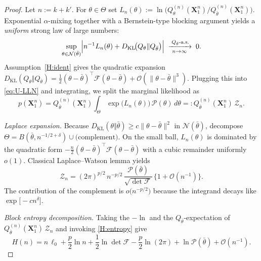 \documentclass{article}
\begin{document}
\begin{proof}
Let $n:=k+k'$.  For $\theta\in\Theta$ set
$L_n(\theta):=
    \ln\!\bigl(Q^{(n)}_\theta(\mathbf X_{1}^{n})/
                Q^{(n)}_{\bar\theta}(\mathbf X_{1}^{n})\bigr)$.
Exponential $\alpha$-mixing together with a Bernstein-type blocking argument
\citep{dedecker2007weak,dedecker2003conditional} yields a \emph{uniform}
strong law of large numbers:
\begin{equation}
  \sup_{\theta\in\mathcal N(\bar\theta)}
  \Bigl|
      n^{-1}L_n(\theta)
      + D_{\mathrm{KL}}\!\bigl(Q_\theta\Vert Q_{\bar\theta}\bigr)
  \Bigr|
  \;\xrightarrow[n\to\infty]{\;Q_{\bar\theta}\textrm{-a.s.}}\;
  0.
  \label{eq:U-LLN}
\end{equation}
Assumption~\ref{H:ident} gives the quadratic expansion
$D_{\mathrm{KL}}(Q_\theta\Vert Q_{\bar\theta})
  =\tfrac12(\theta-\bar\theta)^{\!\top}\!\mathcal F(\theta-\bar\theta)
   +\mathcal O(\|\theta-\bar\theta\|^{3})$.
Plugging this into \eqref{eq:U-LLN} and integrating, we split the marginal
likelihood as
\[
  p(\mathbf X_{1}^{n})
  = Q^{(n)}_{\bar\theta}(\mathbf X_{1}^{n})
    \int_{\Theta} \exp\!\bigl(L_{n}(\theta)\bigr)\,
                 \mathcal P(\theta)\,d\theta
  =: Q^{(n)}_{\bar\theta}(\mathbf X_{1}^{n})\,\mathcal Z_n.
\]

\emph{Laplace expansion.}  Because
$D_{\mathrm{KL}}(\theta\Vert\bar\theta)\ge
  c\|\theta-\bar\theta\|^{2}$ in $\mathcal N(\bar\theta)$, decompose
$\Theta=B(\bar\theta,n^{-1/2+\delta})\cup\text{(complement)}$.  On the small
ball, $L_n(\theta)$ is dominated by the quadratic form
$-\frac n2(\theta-\bar\theta)^{\!\top}\!\mathcal F(\theta-\bar\theta)$ with a
cubic remainder uniformly $o(1)$.  Classical Laplace–Watson lemma
\citep[Chap.\,6]{bleistein2012asymptotic} yields
\begin{equation}
  \mathcal Z_n
  =(2\pi)^{p/2}\,n^{-p/2}\,
    \frac{\mathcal P(\bar\theta)}{\sqrt{\det\mathcal F}}\,
    \bigl\{1+\mathcal O(n^{-1})\bigr\}.
  \label{eq:Laplace}
\end{equation}
The contribution of the complement is $o\!\bigl(n^{-p/2}\bigr)$ because the
integrand decays like $\exp\!\bigl[-c n^{\delta}\bigr]$.

\emph{Block entropy decomposition.}
Taking the $-\ln$ and the $Q_{\bar\theta}$-expectation of
$Q^{(n)}_{\bar\theta}(\mathbf X_{1}^{n})\,\mathcal Z_n$
and invoking \ref{H:entropy} give
\begin{equation}
  H(n)
  = n\,\ell_{0}
    +\frac{p}{2}\ln n
    +\frac12\ln\det\mathcal F
    -\frac{p}{2}\ln(2\pi)
    +\ln\mathcal P(\bar\theta)
    +\mathcal O(n^{-1}).
  \label{eq:H(n)}
\end{equation}


\end{proof}
\end{document}
